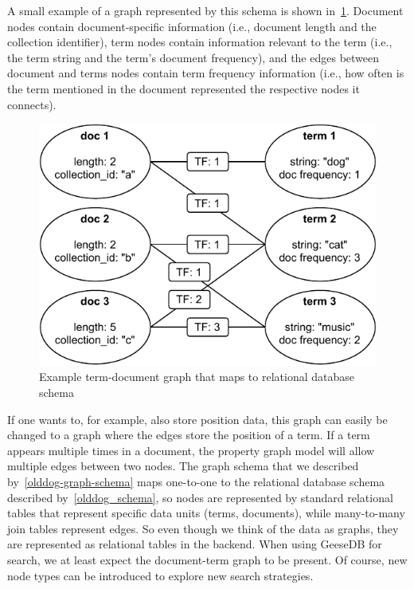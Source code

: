 A small example of a graph represented by this schema is shown in~\cref{example-olddog-graph}. Document nodes contain document-specific information (i.e., document length and the collection identifier), term nodes contain information relevant to the term (i.e., the term string and the term's document frequency), and the edges between document and terms nodes contain term frequency information (i.e., how often is the term mentioned in the document represented the respective nodes it connects).
\begin{figure}
	\centering
	\includegraphics[width=\linewidth]{./imgs/example_olddog_graph.pdf}
	\caption{Example term-document graph that maps to relational database schema}
	\label{example-olddog-graph}
\end{figure}
If one wants to, for example, also store position data, this graph can easily be changed to a graph where the edges store the position of a term. If a term appears multiple times in a document, the property graph model will allow multiple edges between two nodes. The graph schema that we described by~\cref{olddog-graph-schema} maps one-to-one to the relational database schema described by~\cref{olddog_schema}, so nodes are represented by standard relational tables that represent specific data units (terms, documents), while many-to-many join tables represent edges. So even though we think of the data as graphs, they are represented as relational tables in the backend. When using GeeseDB for search, we at least expect the document-term graph to be present. Of course, new node types can be introduced to explore new search strategies. 

